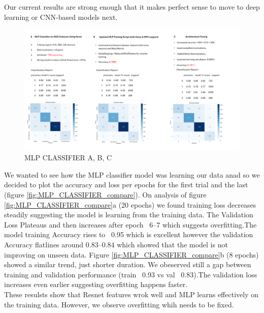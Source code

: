 \documentclass{article}
\begin{document}
Our current results are strong enough that it makes perfect sense to move to deep learning or CNN-based models next.
\begin{figure}[ht] %
    \centering
    \includegraphics[width=1.0\linewidth]{mlpclassifier a,b,c.png}
    \caption{MLP CLASSIFIER A, B, C}
    \label{fig:MLP_CLASSIFIER}
\end{figure}
We wanted to see how the MLP classifier model was learning our data anad so we decided to plot the accuracy and loss per epochs for the first trial and the last (figure \ref{fig:MLP_CLASSIFIER_compare}). On analysis of figure \ref{fig:MLP_CLASSIFIER_compare}a (20 epochs) we found training loss decreases steadily suggesting the model is learning from the training data.
The Validation Loss Plateaus and then increases after epoch ~6–7 which suggests overfitting.The model training Accuracy rises to ~0.95 which is excellent however the validation Accuracy flatlines around 0.83–0.84 which showed that the model is not improving on unseen data.
Figure \ref{fig:MLP_CLASSIFIER_compare}b (8 epochs) showed a similar trend, just shorter duration. We obeserved still a gap between training and validation performance (train ~0.93 vs val ~0.83).The validation loss increases even earlier suggesting overfitting happens faster.\\
These resulsts show that Resnet features wrok well and MLP learns effectively on the training data. However, we observe overfitting whih needs to be fixed.\\
\end{document}
